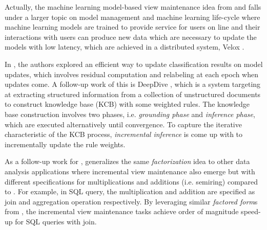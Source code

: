 Actually, the machine learning model-based view maintenance idea from \cite{deshpande2006mauvedb} and \cite{gupta2015processing} falls under a larger topic on model management and machine learning life-cycle \cite{crankshawmissing} where machine learning models are trained to provide service for users on line and their interactions with users can produce new data which are necessary to update the models with low latency, which are achieved in a distributed system, Velox \cite{crankshawmissing}.

In \cite{koc2011incrementally}, the authors explored an efficient way to update classification results on model updates, which involves residual computation and relabeling at each epoch when updates come. A follow-up work of this is DeepDive \cite{shin2015incremental}, which is a system targeting at extracting structured information from a collection of unstructured documents to construct knowledge base (KCB) with some weighted rules. The knowledge base construction involves two phases, i.e. {\em grounding phase} and {\em inference phase}, which are executed alternatively until convergence. To capture the iterative characteristic of the KCB process, {\em incremental inference} is come up with to incrementally update the rule weights.

As a follow-up work for \cite{nikolic2014linview}, \cite{nikolic2018incremental} generalizes the same {\em factorization} idea to other data analysis applications where incremental view maintenance also emerge but with different specifications for multiplications and additions (i.e. semiring) compared to \cite{nikolic2014linview}. For example, in SQL query, the multiplication and addition are specified as join and aggregation operation respectively. By leveraging similar {\em factored form}s from \cite{nikolic2014linview}, the incremental view maintenance tasks achieve order of magnitude speed-up for SQL queries with join.

